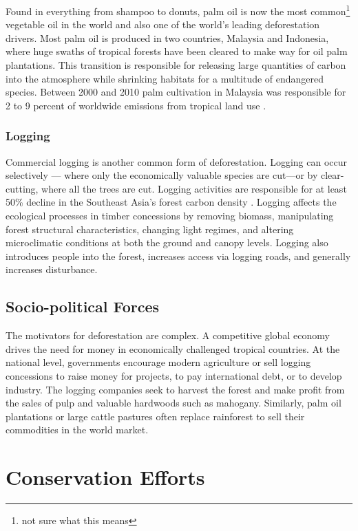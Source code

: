 Found in everything from shampoo to donuts, palm oil is now the most common\footnote{not sure what this means} vegetable oil in the world and also one of the world's leading deforestation drivers. Most palm oil is produced in two countries, Malaysia and Indonesia, where huge swaths of tropical forests have been cleared to make way for oil palm plantations. This transition is responsible for releasing large quantities of carbon into the atmosphere while shrinking habitats for a multitude of endangered species. Between 2000 and 2010 palm cultivation in Malaysia was responsible for 2 to 9 percent of worldwide emissions from tropical land use \citep{carlson2013refined}. 

\subsubsection{Logging} 

Commercial logging is another common form of deforestation. Logging can occur selectively --- where only the economically valuable species are cut---or by clear-cutting, where all the trees are cut. Logging activities are responsible for at least 50\% decline in the Southeast Asia's forest carbon density \citep{hawthorne2011impact}. Logging affects the ecological processes in timber concessions by removing biomass, manipulating forest structural characteristics, changing light regimes, and altering microclimatic conditions at both the ground and canopy levels. Logging also introduces people into the forest, increases access via logging roads, and generally increases disturbance. 

\subsection{Socio-political Forces}

The motivators for deforestation are complex. A competitive global economy drives the need for money in economically challenged tropical countries. At the national level, governments encourage modern agriculture or sell logging concessions to raise money for projects, to pay international debt, or to develop industry. The logging companies seek to harvest the forest and make profit from the sales of pulp and valuable hardwoods such as mahogany. Similarly, palm oil plantations or large cattle pastures often replace rainforest to sell their commodities in the world market. 

\section{Conservation Efforts}

